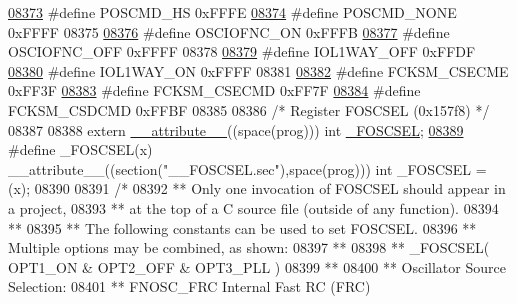 \begin{DoxyCode}
{{{{\hypertarget{a00015_source_l08373}{}\hyperlink{a00015_a24434b72a63fcd22bddc716d96953657}{08373} \textcolor{preprocessor}{#define POSCMD\_HS            0xFFFE}
\hypertarget{a00015_source_l08374}{}\hyperlink{a00015_aac901a76d1e044e1679bbd47e7fff186}{08374} \textcolor{preprocessor}{#define POSCMD\_NONE          0xFFFF}
08375 
\hypertarget{a00015_source_l08376}{}\hyperlink{a00015_ae1dc2c395c9a8f56047b4cc596c24914}{08376} \textcolor{preprocessor}{#define OSCIOFNC\_ON          0xFFFB}
\hypertarget{a00015_source_l08377}{}\hyperlink{a00015_a19af11fd10f863d184cbeaf76a319bbc}{08377} \textcolor{preprocessor}{#define OSCIOFNC\_OFF         0xFFFF}
08378 
\hypertarget{a00015_source_l08379}{}\hyperlink{a00015_ac7d3bd59e6163fbdb321c70d26259957}{08379} \textcolor{preprocessor}{#define IOL1WAY\_OFF          0xFFDF}
\hypertarget{a00015_source_l08380}{}\hyperlink{a00015_a18076e33c5b0e6fd8402b36cdef4035f}{08380} \textcolor{preprocessor}{#define IOL1WAY\_ON           0xFFFF}
08381 
\hypertarget{a00015_source_l08382}{}\hyperlink{a00015_a3b3c8eac4d4421e6b1c4ee083dc4fa72}{08382} \textcolor{preprocessor}{#define FCKSM\_CSECME         0xFF3F}
\hypertarget{a00015_source_l08383}{}\hyperlink{a00015_a001fd37194796130d0a3b27a0dc7979b}{08383} \textcolor{preprocessor}{#define FCKSM\_CSECMD         0xFF7F}
\hypertarget{a00015_source_l08384}{}\hyperlink{a00015_a11f6a0b3b14aed1bef93ec8af79b271e}{08384} \textcolor{preprocessor}{#define FCKSM\_CSDCMD         0xFFBF}
08385 
08386 \textcolor{comment}{/* Register FOSCSEL (0x157f8)                               */}
08387 
08388 \textcolor{keyword}{extern} \hyperlink{a00015_a493c46f03454991ccc5aa7a6e1dfb2a7}{\_\_attribute\_\_}((space(prog))) int \hyperlink{a00015_a476dc13664037647093609ee08fab219}{\_FOSCSEL};
\hypertarget{a00015_source_l08389}{}\hyperlink{a00015_a476dc13664037647093609ee08fab219}{08389} \textcolor{preprocessor}{#define \_FOSCSEL(x) \_\_attribute\_\_((section("\_\_FOSCSEL.sec"),space(prog))) int \_FOSCSEL = (x);}
08390 
08391 \textcolor{comment}{/*}
08392 \textcolor{comment}{** Only one invocation of FOSCSEL should appear in a project,}
08393 \textcolor{comment}{** at the top of a C source file (outside of any function).}
08394 \textcolor{comment}{**}
08395 \textcolor{comment}{** The following constants can be used to set FOSCSEL.}
08396 \textcolor{comment}{** Multiple options may be combined, as shown:}
08397 \textcolor{comment}{**}
08398 \textcolor{comment}{** \_FOSCSEL( OPT1\_ON & OPT2\_OFF & OPT3\_PLL )}
08399 \textcolor{comment}{**}
08400 \textcolor{comment}{**   Oscillator Source Selection:}
08401 \textcolor{comment}{**     FNOSC\_FRC            Internal Fast RC (FRC)}
}}}}
\end{DoxyCode}
